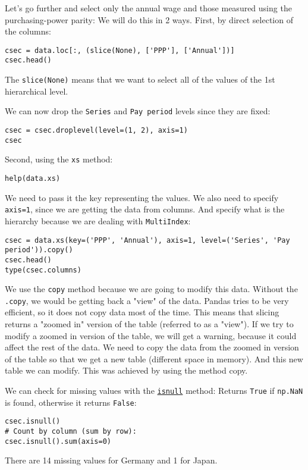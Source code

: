 \documentclass[12pt, a4paper]{article}
\begin{document}
Let's go further and select only the annual wage and those measured using the purchasing-power parity:
We will do this in 2 ways.
First, by direct selection of the columns:
\lstset{language=jupyter-python,label= ,caption= ,captionpos=b,numbers=none}
\begin{lstlisting}
csec = data.loc[:, (slice(None), ['PPP'], ['Annual'])]
csec.head()
\end{lstlisting}
The \texttt{slice(None)} means that we want to select all of the values of the 1st hierarchical level.

We can now drop the \texttt{Series} and \texttt{Pay period} levels since they are fixed:
\lstset{language=jupyter-python,label= ,caption= ,captionpos=b,numbers=none}
\begin{lstlisting}
csec = csec.droplevel(level=(1, 2), axis=1)
csec
\end{lstlisting}

Second, using the \texttt{xs} method:
\lstset{language=jupyter-python,label= ,caption= ,captionpos=b,numbers=none}
\begin{lstlisting}
help(data.xs)
\end{lstlisting}
We need to pass it the key representing the values.
We also need to specify \texttt{axis=1}, since we are getting the data from columns.
And specify what is the hierarchy because we are dealing with \texttt{MultiIndex}:
\lstset{language=jupyter-python,label= ,caption= ,captionpos=b,numbers=none}
\begin{lstlisting}
csec = data.xs(key=('PPP', 'Annual'), axis=1, level=('Series', 'Pay period')).copy()
csec.head()
type(csec.columns)
\end{lstlisting}
We use the \texttt{copy} method because we are going to modify this data.
Without the \texttt{.copy}, we would be getting back a "view" of the data.
Pandas tries to be very efficient, so it does not copy data most of the time.
This means that slicing returns a "zoomed in" version of the table (referred to as a "view").
If we try to modify a zoomed in version of the table, we will get a warning, because it could affect the rest of the data.
We need to copy the data from the zoomed in version of the table so that we get a new table (different space in memory).
And this new table we can modify. This was achieved by using the method copy.

We can check for missing values with the \href{https://pandas.pydata.org/pandas-docs/stable/reference/api/pandas.DataFrame.isnull.html?highlight=isnull}{\texttt{isnull}} method:
Returns \texttt{True} if \texttt{np.NaN} is found, otherwise it returns \texttt{False}:
\lstset{language=jupyter-python,label= ,caption= ,captionpos=b,numbers=none}
\begin{lstlisting}
csec.isnull()
# Count by column (sum by row):
csec.isnull().sum(axis=0)
\end{lstlisting}
There are 14 missing values for Germany and 1 for Japan.
\end{document}
